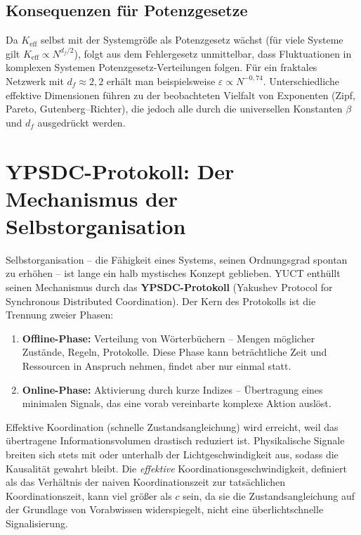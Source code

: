 \documentclass[11pt]{article}
\theoremstyle{remark}
\newcommand{\Keff}{K_{\mathrm{eff}}}
\begin{document}
	\subsection{Konsequenzen für Potenzgesetze}
	
	Da \(\Keff\) selbst mit der Systemgröße als Potenzgesetz wächst (für viele Systeme gilt \(\Keff \propto N^{d_f/2}\)), folgt aus dem Fehlergesetz unmittelbar, dass Fluktuationen in komplexen Systemen Potenzgesetz-Verteilungen folgen. Für ein fraktales Netzwerk mit \(d_f \approx 2,2\) erhält man beispielsweise \(\varepsilon \propto N^{-0,74}\). Unterschiedliche effektive Dimensionen führen zu der beobachteten Vielfalt von Exponenten (Zipf, Pareto, Gutenberg–Richter), die jedoch alle durch die universellen Konstanten \(\beta\) und \(d_f\) ausgedrückt werden.
	
	\section{YPSDC-Protokoll: Der Mechanismus der Selbstorganisation}
	\label{sec:ypsdc}
	
	Selbstorganisation – die Fähigkeit eines Systems, seinen Ordnungsgrad spontan zu erhöhen – ist lange ein halb mystisches Konzept geblieben. YUCT enthüllt seinen Mechanismus durch das \textbf{YPSDC-Protokoll} (Yakushev Protocol for Synchronous Distributed Coordination). Der Kern des Protokolls ist die Trennung zweier Phasen:
	\begin{enumerate}
		\item \textbf{Offline-Phase:} Verteilung von Wörterbüchern – Mengen möglicher Zustände, Regeln, Protokolle. Diese Phase kann beträchtliche Zeit und Ressourcen in Anspruch nehmen, findet aber nur einmal statt.
		\item \textbf{Online-Phase:} Aktivierung durch kurze Indizes – Übertragung eines minimalen Signals, das eine vorab vereinbarte komplexe Aktion auslöst.
	\end{enumerate}
	
	Effektive Koordination (schnelle Zustandsangleichung) wird erreicht, weil das übertragene Informationsvolumen drastisch reduziert ist. Physikalische Signale breiten sich stets mit oder unterhalb der Lichtgeschwindigkeit aus, sodass die Kausalität gewahrt bleibt. Die \emph{effektive} Koordinationsgeschwindigkeit, definiert als das Verhältnis der naiven Koordinationszeit zur tatsächlichen Koordinationszeit, kann viel größer als \(c\) sein, da sie die Zustandsangleichung auf der Grundlage von Vorabwissen widerspiegelt, nicht eine überlichtschnelle Signalisierung.
	
\end{document}
